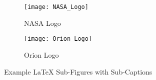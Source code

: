 \begin{figure}[H]
\begin{subfigure}[b]{0.5\textwidth}
   \centering 
   \texttt{[image: NASA\_Logo]}
   \caption{NASA Logo} 
   \label{fig:NASA Logo}
\end{subfigure}%
\begin{subfigure}[b]{0.5\textwidth}
   \centering 
   \texttt{[image: Orion\_Logo]}
   \caption{Orion Logo} 
   \label{fig:Orion Logo}
\end{subfigure}%
   \caption{Example LaTeX Sub-Figures with Sub-Captions} 
   \label{fig:example-subfigure}
\end{figure}